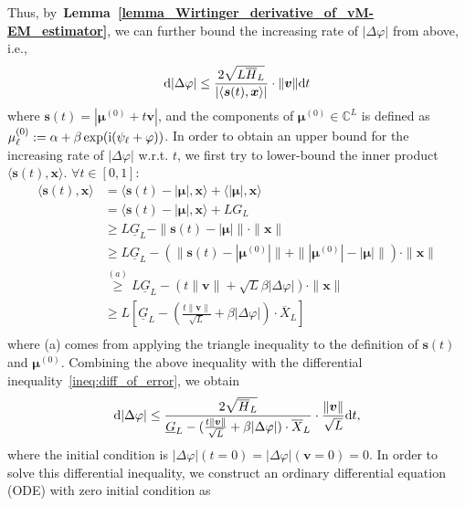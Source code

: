 \documentclass[a4paper,12pt]{article}
\def \ri {{\rm i}}
\begin{document}
Thus, by~{\bf Lemma~\ref{lemma_Wirtinger_derivative_of_vM-EM_estimator}}, we can further bound the increasing rate of $|\Delta\varphi|$ from above, i.e., 
\begin{equation}
    {\rm d}|\Delta\varphi| \leq \frac{2\sqrt{L\overline{H}_L}}{|\langle{\bm s}(t), {\bm x}\rangle|} \cdot \|{\bm v}\|{\rm d}t
    \label{ineq:diff_of_error}
\end{equation}
where ${\bm s}(t) = |{\bm \mu}^{(0)} + t{\bm v}|$, and the components of ${\bm \mu}^{(0)}\in\mathbb{C}^L$ is defined as $\mu_\ell^{(0)}:= \alpha+\beta\exp(\ri (\psi_\ell + \varphi))$. In order to obtain an upper bound for the increasing rate of $|\Delta\varphi|$ w.r.t. $t$, we first try to lower-bound the inner product $\langle{\bm s}(t), {\bm x}\rangle$. $\forall t\in[0,1]$: 
\begin{equation}
    \begin{aligned}
    \langle{\bm s}(t), {\bm x}\rangle &= \langle{\bm s}(t) - |{\bm \mu}|, {\bm x}\rangle + \langle|{\bm\mu}|,{\bm x}\rangle\\
    &= \langle{\bm s}(t) - |{\bm \mu}|, {\bm x}\rangle + LG_L \\
    &\geq L\underline{G}_L-\|{\bm s}(t) - |{\bm \mu}|\|\cdot\|{\bm x}\| \\
    & \geq L\underline{G}_L-(\|{\bm s}(t) - |{\bm \mu}^{(0)}|\|+\||{\bm \mu}^{(0)}| - |{\bm \mu}|\|)\cdot\|{\bm x}\| \\
    &\overset{(a)}{\geq} L\underline{G}_L-(t\|{\bm v}\| + \sqrt{L}\beta|\Delta\varphi|)\cdot\|{\bm x}\| \\
    &\geq L\left[\underline{G}_L-(\frac{t\|{\bm v}\|}{\sqrt{L}}+\beta|\Delta\varphi|)\cdot \overline{X}_L \right]\\
    \end{aligned}
\end{equation}
where (a) comes from applying the triangle inequality to the definition of ${\bm s}(t)$ and ${\bm \mu}^{(0)}$. Combining the above inequality with the differential inequality~\eqref{ineq:diff_of_error}, we obtain 
\begin{equation}
    {\rm d}|\Delta\varphi|\leq \frac{2\sqrt{\overline{H}_L}}{\underline{G}_L-(\frac{t\|{\bm v}\|}{\sqrt{L}}+\beta|\Delta\varphi|)\cdot \overline{X}_L }\cdot \frac{\|{\bm v}\|}{\sqrt{L}} {\rm d}t,
    \label{ineq:increasing-rate-constraint}
\end{equation}
where the initial condition is $|\Delta\varphi|(t=0) = |\Delta\varphi|({\bm v} = 0)=0$. In order to solve this differential inequality, we construct an ordinary differential equation (ODE) with zero initial condition as 
\end{document}
